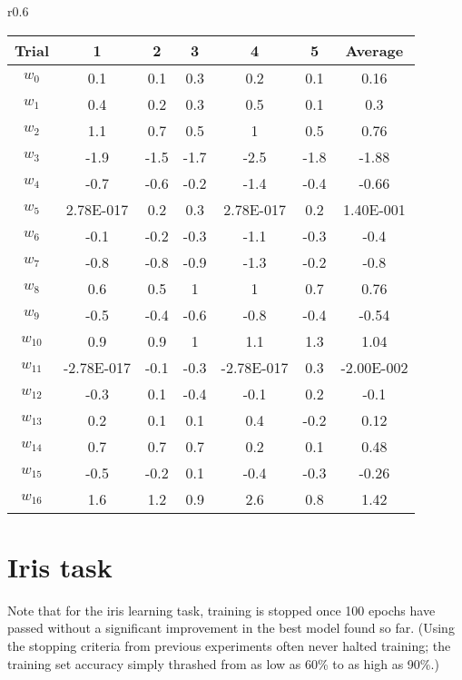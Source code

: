 \documentclass[12pt,letterpaper]{article}
\begin{document}
\begin{wrapfigure}{r}{0.6\textwidth}
\begin{tabular}{ccccccc}
\toprule
Trial	&	1	&	2	&	3	&	4	&	5	&	Average\\
\hline
$w_0$	&	0.1	&	0.1	&	0.3	&	0.2	&	0.1	&	0.16\\
$w_1$	&	0.4	&	0.2	&	0.3	&	0.5	&	0.1	&	0.3\\
$w_2$	&	1.1	&	0.7	&	0.5	&	1	&	0.5	&	0.76\\
$w_3$	&	-1.9	&	-1.5	&	-1.7	&	-2.5	&	-1.8	&	-1.88\\
$w_4$	&	-0.7	&	-0.6	&	-0.2	&	-1.4	&	-0.4	&	-0.66\\
$w_5$	&	2.78E-017	&	0.2	&	0.3	&	2.78E-017	&	0.2	&	1.40E-001\\
$w_6$	&	-0.1	&	-0.2	&	-0.3	&	-1.1	&	-0.3	&	-0.4\\
$w_7$	&	-0.8	&	-0.8	&	-0.9	&	-1.3	&	-0.2	&	-0.8\\
$w_8$	&	0.6	&	0.5	&	1	&	1	&	0.7	&	0.76\\
$w_9$	&	-0.5	&	-0.4	&	-0.6	&	-0.8	&	-0.4	&	-0.54\\
$w_{10}$	&	0.9	&	0.9	&	1	&	1.1	&	1.3	&	1.04\\
$w_{11}$	&	-2.78E-017	&	-0.1	&	-0.3	&	-2.78E-017	&	0.3	&	-2.00E-002\\
$w_{12}$	&	-0.3	&	0.1	&	-0.4	&	-0.1	&	0.2	&	-0.1\\
$w_{13}$	&	0.2	&	0.1	&	0.1	&	0.4	&	-0.2	&	0.12\\
$w_{14}$	&	0.7	&	0.7	&	0.7	&	0.2	&	0.1	&	0.48\\
$w_{15}$	&	-0.5	&	-0.2	&	0.1	&	-0.4	&	-0.3	&	-0.26\\
$w_{16}$	&	1.6	&	1.2	&	0.9	&	2.6	&	0.8	&	1.42\\
\bottomrule
\end{tabular}
\end{wrapfigure}


\section*{Iris task}

Note that for the iris learning task, training is stopped once 100 epochs have passed without a significant improvement in the best model found so far. (Using the stopping criteria from previous experiments often never halted training; the training set accuracy simply thrashed from as low as 60\% to as high as 90\%.)
\end{document}
